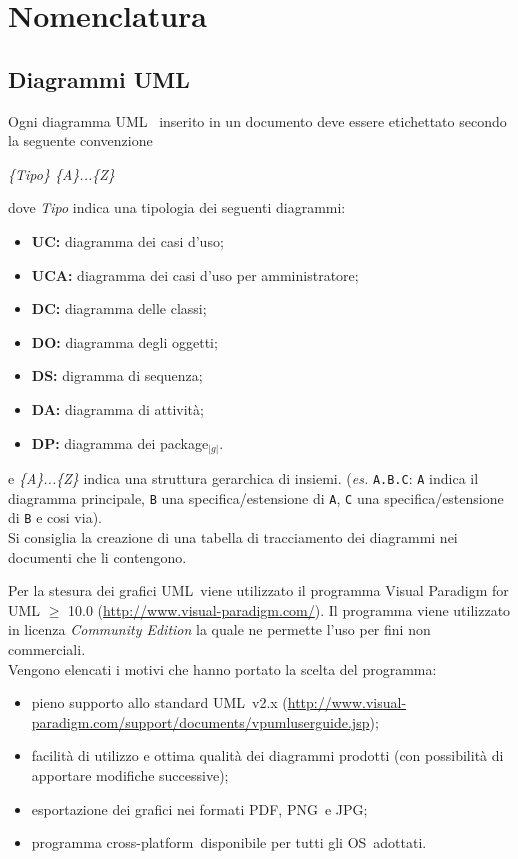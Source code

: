 \section{Nomenclatura} {
	\subsection{Diagrammi UML} {
		Ogni diagramma UML\g~ inserito in un documento deve essere etichettato secondo la seguente convenzione
		\begin{center}
			\textit{\{Tipo\} \{A\}...\{Z\}}
		\end{center}dove \textit{Tipo} indica una tipologia dei seguenti diagrammi:
		\begin{itemize}
			\item [] \textbf{UC:} diagramma dei casi d’uso;
			\item [] \textbf{UCA:} diagramma dei casi d’uso per amministratore;
			\item [] \textbf{DC:} diagramma delle classi;
			\item [] \textbf{DO:} diagramma degli oggetti;
			\item [] \textbf{DS:} digramma di sequenza;
			\item [] \textbf{DA:} diagramma di attività;
			\item [] \textbf{DP:} diagramma dei package$_{|g|}$.
		\end{itemize}e \textit{\{A\}...\{Z\}} indica una struttura gerarchica di insiemi. (\textit{es.} \texttt{A.B.C}: \texttt{A} indica il diagramma principale, \texttt{B} una specifica/estensione di \texttt{A}, \texttt{C} una specifica/estensione di \texttt{B} e cosi via). \\
		
		Si consiglia la creazione di una tabella di tracciamento dei diagrammi nei documenti che li contengono.

		Per la stesura dei grafici UML\g \ viene utilizzato il programma Visual Paradigm for UML $\geqslant$ 10.0 (\url{http://www.visual-paradigm.com/}). Il programma viene utilizzato in licenza \emph{Community Edition} la quale ne permette l'uso per fini non commerciali.\\
		Vengono elencati i motivi che hanno portato la scelta del programma:
		\begin{itemize}
			\item pieno supporto allo standard UML\g \ v2.x (\url{http://www.visual-paradigm.com/support/documents/vpumluserguide.jsp});
			\item facilità di utilizzo e ottima qualità dei diagrammi prodotti (con possibilità di apportare modifiche successive);
			\item esportazione dei grafici nei formati PDF\g, PNG\g \ e JPG\g;
			\item programma cross-platform\g \ disponibile per tutti gli OS\g \ adottati.
		\end{itemize} 
	}
	
}
